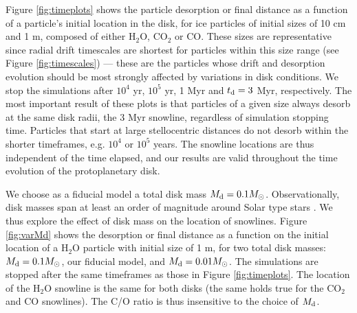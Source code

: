 \documentclass[apj]{emulateapj}
\begin{document}
Figure \ref{fig:timeplots} shows the particle desorption or final distance as a function of a particle's initial location in the disk, for ice particles %
of initial sizes of 10 cm and 1 m, composed of either H$_2$O, CO$_2$ or CO. These sizes are representative since radial drift timescales are shortest for particles within this size range (see Figure \ref{fig:timescales}) --- these are the particles whose drift and desorption evolution should be most strongly affected by variations in disk conditions. We stop the simulations after $10^4$ yr, $10^5$ yr, 1 Myr and $t_{\rm d}=3$ Myr, respectively. %
The most important result of these plots is that particles of a given size always desorb at the same disk radii, the 3 Myr snowline, regardless of simulation stopping time.  Particles %
that start at large stellocentric distances do not desorb within the shorter timeframes, e.g. $10^4$ or $10^5$ years. %
The snowline locations are thus independent of the time elapsed, and %
our results are %
valid throughout the time evolution of the protoplanetary disk. 

We choose as a fiducial model a total disk mass $M_{\rm d}=0.1 M_{\odot}$. Observationally, disk masses span at least an order of magnitude around Solar type stars %
\citep{andrews13}. %
We thus explore the effect of disk mass on the location of snowlines. Figure \ref{fig:varMd} shows the desorption or final distance as a function on the initial location of a H$_2$O particle with initial size of 1 m, for two total disk masses: $M_{\rm d}=0.1 M_{\odot}$, our fiducial model, and $M_{\rm d}=0.01 M_{\odot}$. The simulations are stopped after the same timeframes as those in Figure \ref{fig:timeplots}. The location of the H$_2$O snowline is the same for both disks (the same holds true for the CO$_2$ and CO snowlines). The C/O ratio is thus insensitive to the choice of $M_{\rm d}$. %
\end{document}
